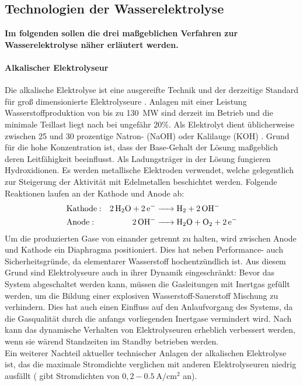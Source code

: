\subsection{Technologien der Wasserelektrolyse}
\label{subsec:Technologien der Wasserelektrolyse}
\textbf{Im folgenden sollen die drei maßgeblichen Verfahren zur Wasserelektrolyse näher erläutert werden.}
\paragraph{Alkalischer Elektrolyseur}
\label{par:Alkalischer Elektrolyseur}
Die alkalische Elektrolyse ist eine ausgereifte Technik und der derzeitige Standard für groß dimensionierte Elektrolyseure \citep{tremel_electrolysisfundamental_2018}. Anlagen mit einer Leistung Wasserstoffproduktion von bis zu \SI{130}{\mega\W}  sind derzeit im Betrieb und die minimale Teillast liegt nach \citep{guandalini_comparative_2016} bei ungefähr 20\%. Als Elektrolyt dient üblicherweise zwischen 25 und 30 prozentige Natron- (NaOH) oder Kalilauge (KOH) \citep{tremel_electrolysisfundamental_2018}. Grund für die hohe Konzentration ist, dass der Base-Gehalt der Lösung maßgeblich deren Leitfähigkeit beeinflusst. Als Ladungsträger in der Lösung fungieren Hydroxidionen. Es werden metallische Elektroden verwendet, welche gelegentlich zur Steigerung der Aktivität mit Edelmetallen beschichtet werden. Folgende Reaktionen laufen an der Kathode und Anode ab:
\begin{align}
  \ce{	&{Kathode:} &2H2O + 2 e^- &-> H2 + 2OH^-\\
  		&{Anode:} &2OH^- &-> H2O + O2 + 2 e^-} 
\end{align}
Um die produzierten Gase von einander getrennt zu halten, wird zwischen Anode und Kathode ein Diaphragma positioniert. Dies hat neben Performance- auch Sicherheitsgründe, da elementarer Wasserstoff hochentzündlich ist. Aus diesem Grund sind Elektrolyseure auch in ihrer Dynamik eingeschränkt: Bevor das System abgeschaltet werden kann, müssen die Gasleitungen mit Inertgas gefüllt werden, um die Bildung einer explosiven Wasserstoff-Sauerstoff Mischung zu verhindern. Dies hat auch einen Einfluss auf den Anlaufvorgang des Systems, da die Gasqualität durch die anfangs vorliegenden Inertgase vermindert wird. Nach \citet{Milanzi} kann das dynamische Verhalten von Elektrolyseuren erheblich verbessert werden, wenn sie wärend Standzeiten im Standby betrieben werden. \\ 
Ein weiterer Nachteil aktueller technischer Anlagen der alkalischen Elektrolyse ist, das die maximale Stromdichte verglichen mit anderen Elektrolyseuren niedrig ausfällt (\citet{tremel_electrolysisfundamental_2018} gibt Stromdichten von $0,2-\SI{0,5}{\A\per\cm\squared}$ an).

